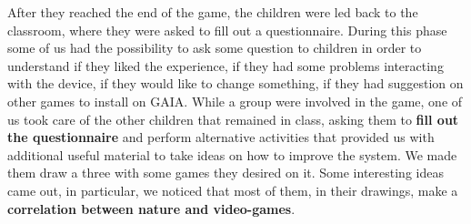 \documentclass[a4paper,11pt]{report}
\begin{document}
After they reached the end of the game, the children were led back to the classroom, where they were asked to fill out a questionnaire. During this phase some of us had the possibility to ask some question to children in order to understand if they liked the experience, if they had some problems interacting with the device, if they would like to change something, if they had suggestion on other games to install on GAIA. While a group were involved in the game, one of us took care of the other children that remained in class, asking them to \textbf{fill out the questionnaire} and perform alternative activities that provided us with additional useful material to take ideas on how to improve the system. We made them draw a three with some games they desired on it. Some interesting ideas came out, in particular, we noticed that most of them, in their drawings, make a \textbf{correlation between nature and video-games}.
\end{document}
